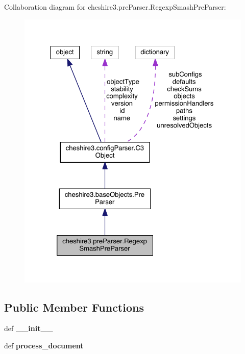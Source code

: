 Collaboration diagram for cheshire3.\-pre\-Parser.\-Regexp\-Smash\-Pre\-Parser\-:
\nopagebreak
\begin{figure}[H]
\begin{center}
\leavevmode
\includegraphics[width=325pt]{classcheshire3_1_1pre_parser_1_1_regexp_smash_pre_parser__coll__graph}
\end{center}
\end{figure}
\subsection*{Public Member Functions}
\begin{DoxyCompactItemize}
\item 
\hypertarget{classcheshire3_1_1pre_parser_1_1_regexp_smash_pre_parser_a65a5a0fb7e035ee26e5244d403eb88ef}{def {\bfseries \-\_\-\-\_\-init\-\_\-\-\_\-}}\label{classcheshire3_1_1pre_parser_1_1_regexp_smash_pre_parser_a65a5a0fb7e035ee26e5244d403eb88ef}

\item 
\hypertarget{classcheshire3_1_1pre_parser_1_1_regexp_smash_pre_parser_a90348b5264c35498e1032c174ad40fe3}{def {\bfseries process\-\_\-document}}\label{classcheshire3_1_1pre_parser_1_1_regexp_smash_pre_parser_a90348b5264c35498e1032c174ad40fe3}

\end{DoxyCompactItemize}
